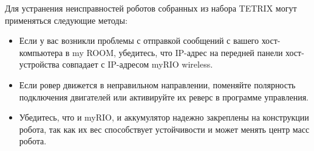 Для устранения неисправностей роботов собранных из набора
TETRIX могут применяться следующие методы:
\begin{itemize}
    \item Если у вас возникли проблемы с отправкой сообщений с вашего хост-компьютера в my ROOM, убедитесь, что IP-адрес на передней панели хост-устройства совпадает с IP-адресом myRIO wireless.
    \item Если ровер движется в неправильном направлении, поменяйте полярность подключения двигателей или активируйте их реверс в программе управления.
    \item Убедитесь, что и myRIO, и аккумулятор надежно закреплены на конструкции робота, так как их вес способствует устойчивости и может менять центр масс робота.
\end{itemize}